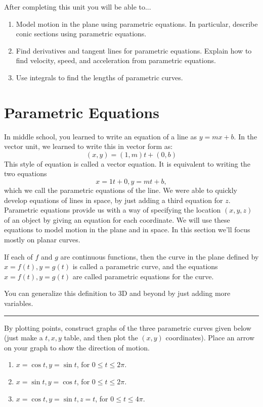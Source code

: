 \noindent After completing this unit you will be able to...
\begin{enumerate}
\item Model motion in the plane using parametric equations. In particular, describe conic sections using parametric equations. 
\item Find derivatives and tangent lines for parametric equations. Explain how to find velocity, speed, and acceleration from parametric equations.
\item Use integrals to find the lengths of parametric curves.
\end{enumerate}


\section{Parametric Equations}
In middle school, you learned to write an equation of a line as $y=mx+b$.  In the vector unit, we learned to write this in vector form as:
 $$(x,y)=(1,m)t+(0,b)$$
This style of equation is called a vector equation.  It is equivalent to writing the two equations $$x=1t+0,y=mt+b,$$ which we call the parametric equations of the line. We were able to quickly develop equations of lines in space, by just adding a third equation for $z$.\\

Parametric equations provide us with a way of specifying the location $(x,y,z)$ of an object by giving an equation for each coordinate.  We will use these equations to model motion in the plane and in space.  In this section we'll focus mostly on planar curves.

\begin{definition}
If each of $f$ and $g$ are continuous functions, then the curve in the plane defined by $x=f(t),y=g(t)$ is called a parametric curve, and the equations $x=f(t),y=g(t)$ are called parametric equations for the curve. 
\end{definition}

You can generalize this definition to 3D and beyond by just adding more variables.

\hrule

\begin{problem} 
%
By plotting points, construct graphs of the three parametric curves given below (just make a $t,x,y$ table, and then plot the $(x,y)$ coordinates).  Place an arrow on your graph to show the direction of motion.
\begin{enumerate}
\item $x=\cos t, y=\sin t$, for $0\leq t\leq 2\pi$.
\item $x=\sin t, y=\cos t$, for $0\leq t\leq 2\pi$.
\item $x=\cos t, y=\sin t, z=t$, for $0\leq t\leq 4\pi$.
\end{enumerate} 
\end{problem}

